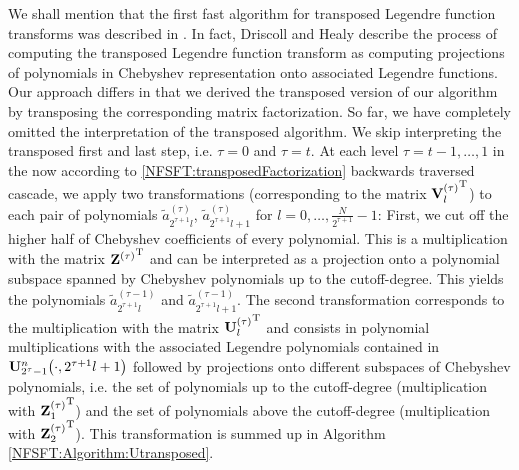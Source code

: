 We shall mention that the first fast algorithm for transposed Legendre 
function transforms was described in \cite{drhe}. In fact, Driscoll and 
Healy describe the process of 
computing the transposed Legendre function transform as computing projections of polynomials in Chebyshev representation onto 
associated Legendre functions. Our approach differs in that we derived the transposed version of our algorithm by transposing 
the corresponding matrix factorization. So far, we have completely omitted the interpretation of the transposed algorithm. 
We skip interpreting the transposed first and last step, i.e. $\tau = 0$ and $\tau = t$. At each level 
$\tau = t-1,\ldots,1$ in the now according to \eqref{NFSFT:transposedFactorization} backwards traversed cascade, we apply
two transformations (corresponding to the matrix ${\mathbf{V}^{(\tau)}_l}^{\text{\rm{T}}}$) to each pair of polynomials 
$\tilde{a}_{2^{\tau+1}l}^{(\tau)}$, $\tilde{a}_{2^{\tau+1}l+1}^{(\tau)}$ for $l=0,\ldots,\frac{N}{2^{\tau+1}}-1$:
First, we cut off the higher half of Chebyshev coefficients of every polynomial. This is a multiplication with the 
matrix ${\mathbf{Z}^{(\tau)}}^{\text{\rm{T}}}$ and can be interpreted as a projection onto a polynomial subspace spanned by Chebyshev polynomials 
up to the cutoff-degree. This yields the polynomials $\tilde{a}_{2^{\tau+1}l}^{(\tau-1)}$ and $\tilde{a}_{2^{\tau+1}l+1}^{(\tau-1)}$.
The second transformation corresponds to the multiplication with the matrix ${\mathbf{U}^{(\tau)}_l}^{\text{\rm{T}}}$ and consists in
polynomial multiplications with the associated Legendre polynomials contained in 
$\mathbf{U}_{2^{\tau}-1}^{n}{\hspace{-0.4ex}}\left(\cdot,2^{\tau+1}l+1\right)$ followed by projections onto different subspaces of Chebyshev 
polynomials, i.e. the set of polynomials up to the cutoff-degree (multiplication with ${\mathbf{Z}_{1}^{(\tau)}}^{\text{\rm{T}}}$) and the set of 
polynomials above the cutoff-degree (multiplication with ${\mathbf{Z}_{2}^{(\tau)}}^{\text{\rm{T}}}$). This transformation is summed up 
in Algorithm \ref{NFSFT:Algorithm:Utransposed}.
